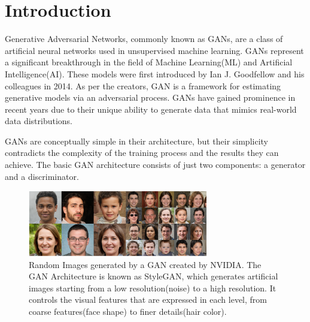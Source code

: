 



\chapter{Introduction}

\noindent Generative Adversarial Networks, commonly known as GANs, are a class of artificial neural networks used in unsupervised machine learning. GANs represent a significant breakthrough in the field of Machine Learning(ML) and Artificial Intelligence(AI). These models were first introduced by Ian J. Goodfellow and his colleagues in 2014\cite{GAN_Main}. As per the creators, GAN is a framework for estimating generative models via an adversarial process\cite{GAN_Main}. GANs have gained prominence in recent years due to their unique ability to generate data that mimics real-world data distributions.

\noindent GANs are conceptually simple in their architecture, but their simplicity contradicts the complexity of the training process and the results they can achieve. The basic GAN architecture consists of just two components: a generator and a discriminator. 

\vspace{2mm}

\begin{figure}[h!]
\centering
\includegraphics[width=0.7\textwidth]{Images/gan_image_variation.png}
\caption[Random Images generated by a GAN introduced by NVIDIA]{Random Images generated by a GAN created by NVIDIA. The GAN Architecture is known as StyleGAN\cite{StyleGAN}, which generates artificial images starting from a low resolution(noise) to a high resolution. It controls the visual features that are expressed in each level, from coarse features(face shape) to finer details(hair color).}
\end{figure}

